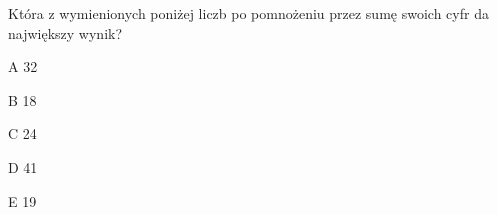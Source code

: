 \begin{tresc}
Która z wymienionych poniżej liczb po pomnożeniu przez sumę swoich cyfr da największy wynik?
\end{tresc}
\begin{wariant}{A} 32 \end{wariant}
\begin{wariant}{B} 18 \end{wariant}
\begin{wariant}{C} 24 \end{wariant}
\begin{wariant}{D} 41 \end{wariant}
\begin{wariant}{E} 19 \end{wariant}
